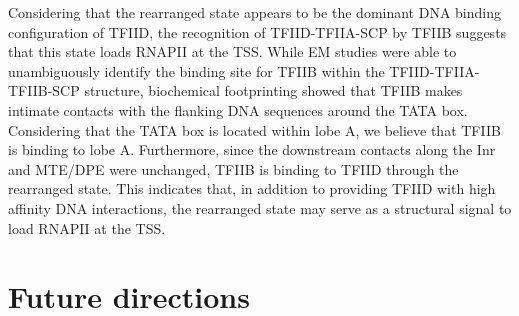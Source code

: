 \indent Considering that the rearranged state appears to be the dominant DNA binding configuration of TFIID, the recognition of TFIID-TFIIA-SCP by TFIIB suggests that this state loads RNAPII at the TSS. While EM studies were able to unambiguously identify the binding site for TFIIB within the TFIID-TFIIA-TFIIB-SCP structure, biochemical footprinting showed that TFIIB makes intimate contacts with the flanking DNA sequences around the TATA box. Considering that the TATA box is located within lobe A, we believe that TFIIB is binding to lobe A. Furthermore, since the downstream contacts along the Inr and MTE/DPE were unchanged, TFIIB is binding to TFIID through the rearranged state. This indicates that, in addition to providing TFIID with high affinity DNA interactions, the rearranged state may serve as a structural signal to load RNAPII at the TSS. \\  

\section{Future directions}

